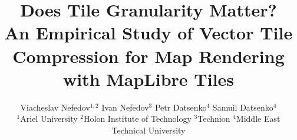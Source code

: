 \documentclass[10pt]{article}
\title{Does Tile Granularity Matter?\\
  An Empirical Study of Vector Tile Compression for Map Rendering with MapLibre Tiles}
\author{%
  Viacheslav Nefedov$^{1,2}$\enspace
  Ivan Nefedov$^{3}$\enspace
  Petr Datsenko$^{4}$\enspace
  Samuil Datsenko$^{4}$ \\[0.4ex]
  \normalfont\small
  $^{1}$Ariel University\quad
  $^{2}$Holon Institute of Technology\quad  
  $^{3}$Technion\quad
  $^{4}$Middle East Technical University
}
\begin{document}
\maketitle










\raggedright

\end{document}
